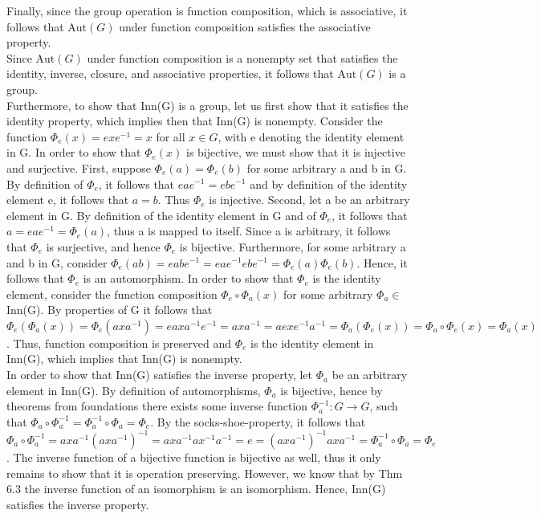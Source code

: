 \documentclass{article}
\newcommand{\Aut}{\mbox{Aut}}
\begin{document}
Finally, since the group operation is function composition, which is associative, it follows that $\Aut(G)$ under function composition satisfies the associative property.\\

Since $\Aut(G)$ under function composition is a nonempty set that satisfies the identity, inverse, closure, and associative properties, it follows that $\Aut(G)$ is a group.\\

Furthermore, to show that Inn(G) is a group, let us first show that it satisfies the identity property, which implies then that Inn(G) is nonempty. Consider the function $\Phi_e(x)=exe^{-1}=x$ for all $x\in G$, with e denoting the identity element in G. In order to show that $\Phi_e(x)$ is bijective, we must show that it is injective and surjective. First, suppose $\Phi_e(a)=\Phi_e(b)$ for some arbitrary a and b in G. By definition of $\Phi_e$, it follows that $eae^{-1}=ebe^{-1}$ and by definition of the identity element e, it follows that $a=b$. Thus $\Phi_e$ is injective. Second, let a be an arbitrary element in G. By definition of the identity element in G and of $\Phi_e$, it follows that $a=eae^{-1}=\Phi_e(a)$, thus a is mapped to itself. Since a is arbitrary, it follows that $\Phi_e$ is surjective, and hence $\Phi_e$ is bijective. Furthermore, for some arbitrary a and b in G, consider $\Phi_e(ab)=eabe^{-1}=eae^{-1}ebe^{-1}=\Phi_e(a)\Phi_e(b)$. Hence, it follows that $\Phi_e$ is an automorphism. In order to show that $\Phi_e$ is the identity element, consider the function composition $\Phi_e \circ \Phi_a(x)$ for some arbitrary $\Phi_a \in$ Inn(G). By properties of G it follows that $\Phi_e(\Phi_a(x))=\Phi_e(axa^{-1})=eaxa^{-1}e^{-1}=axa^{-1}=aexe^{-1}a^{-1}=\Phi_a(\Phi_e(x))=\Phi_a \circ \Phi_e(x)=\Phi_a(x)$. Thus, function composition is preserved and $\Phi_e$ is the identity element in Inn(G), which implies that Inn(G) is nonempty. \\

In order to show that Inn(G) satisfies the inverse property, let $\Phi_a$ be an arbitrary element in Inn(G). By definition of automorphisms, $\Phi_a$ is bijective, hence by theorems from foundations there exists some inverse function $\Phi_a^{-1}: G \rightarrow G$, such that $\Phi_a \circ \Phi_a^{-1} =\Phi_a^{-1} \circ \Phi_a = \Phi_e$. By the socks-shoe-property, it follows that $\Phi_a \circ \Phi_a^{-1} =axa^{-1}(axa^{-1})^{-1}=axa^{-1}ax^{-1}a^{-1}=e=(axa^{-1})^{-1}axa^{-1}=\Phi_a^{-1} \circ \Phi_a = \Phi_e$. The inverse function of a bijective function is bijective as well, thus it only remains to show that it is operation preserving. However, we know that by Thm 6.3 the inverse function of an isomorphism is an isomorphism. Hence, Inn(G) satisfies the inverse property.\\
\end{document}
